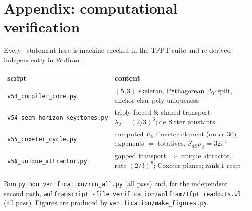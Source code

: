 \documentclass[11pt,a4paper]{article}
\begin{document}
\section*{Appendix: computational verification}
Every \mE\ statement here is machine-checked in the TFPT suite and re-derived independently in Wolfram:
\begin{center}\small\renewcommand{\arraystretch}{1.2}
\begin{tabularx}{\linewidth}{@{}p{4.7cm}Y@{}}
\toprule
\textbf{script} & \textbf{content} \\
\midrule
\texttt{v53\_compiler\_core.py} & $(5,3)$ skeleton, Pythagorean $\Delta_Y$ split, anchor char-poly uniqueness \\
\texttt{v54\_seam\_horizon\_keystones.py} & triply-forced $8$; shared transport $\lambda_2{=}(2/3)^6$; de Sitter constants \\
\texttt{v55\_coxeter\_cycle.py} & computed $E_8$ Coxeter element (order $30$), exponents $=$ totatives, $S_{dS}\rho_\Lambda{=}32\pi^4$ \\
\texttt{v56\_unique\_attractor.py} & gapped transport $\Rightarrow$ unique attractor, rate $(2/3)^6$; Coxeter planes; rank-$1$ reset \\
\bottomrule
\end{tabularx}
\end{center}
Run \texttt{python verification/run\_all.py} (all pass) and, for the independent second path,
\texttt{wolframscript -file\allowbreak{} verification/\allowbreak wolfram/\allowbreak tfpt\_readouts.wl}
(all pass). Figures are produced by \texttt{verification/\allowbreak make\_figures.py}.


\end{document}
